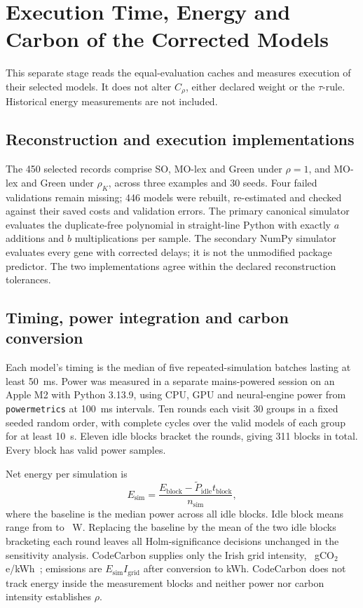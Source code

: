 \section{Execution Time, Energy and Carbon of the Corrected Models}\label{sec:energy}
This separate stage reads the equal-evaluation caches and measures execution of their selected models. It does not alter $C_\rho$, either declared weight or the $\tau$-rule. Historical energy measurements are not included.
\subsection{Reconstruction and execution implementations}
The 450 selected records comprise SO, MO-lex and Green under $\rho=1$, and MO-lex and Green under $\rho_K$, across three examples and 30 seeds. Four failed validations remain missing; 446 models were rebuilt, re-estimated and checked against their saved costs and validation errors. The primary canonical simulator evaluates the duplicate-free polynomial in straight-line Python with exactly $a$ additions and $b$ multiplications per sample. The secondary NumPy simulator evaluates every gene with corrected delays; it is not the unmodified package predictor. The two implementations agree within the declared reconstruction tolerances.
\subsection{Timing, power integration and carbon conversion}
Each model's timing is the median of five repeated-simulation batches lasting at least 50~ms. Power was measured in a separate mains-powered session on an Apple M2 with Python 3.13.9, using CPU, GPU and neural-engine power from \texttt{powermetrics} at 100~ms intervals. Ten rounds each visit 30 groups in a fixed seeded random order, with complete cycles over the valid models of each group for at least 10~s. Eleven idle blocks bracket the rounds, giving 311 blocks in total. Every block has valid power samples.

Net energy per simulation is
\begin{equation}
E_{\mathrm{sim}}=\frac{E_{\mathrm{block}}-\widetilde P_{\mathrm{idle}}t_{\mathrm{block}}}{n_{\mathrm{sim}}},\label{eq:esim}
\end{equation}
where the baseline is the median power across all idle blocks. Idle block means range from \CorrectedIdleMin{} to \CorrectedIdleMax{}~W. Replacing the baseline by the mean of the two idle blocks bracketing each round leaves all Holm-significance decisions unchanged in the sensitivity analysis. CodeCarbon supplies only the Irish grid intensity, \CorrectedCI{}~gCO$_2$e/kWh~\cite{codecarbon}; emissions are $E_{\mathrm{sim}}I_{\mathrm{grid}}$ after conversion to kWh. CodeCarbon does not track energy inside the measurement blocks and neither power nor carbon intensity establishes $\rho$.

